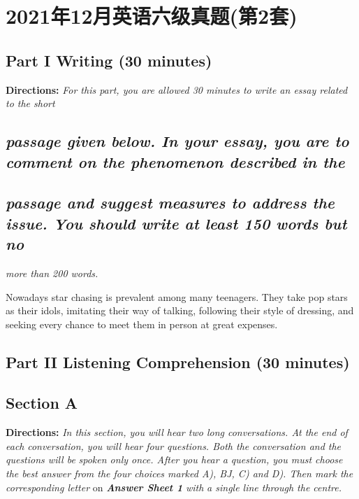 \documentclass[UTF8,11pt]{ctexart}
\begin{document}
\section*{2021年12月英语六级真题(第2套)}
\subsection*{\textbf{Part I} \textbf{Writing} \textbf{(30 minutes)}}


\textbf{Directions: }\textit{For this part, you are allowed 30 minutes to write an essay related to the short}


\subsection*{\textit{passage given below. In your essay, you are to comment on the phenomenon described in the}}


\subsection*{\textit{passage and suggest measures to address the issue. You should write at least 150 words but no}}


\textit{more than 200 words.}


Nowadays star chasing is prevalent among many teenagers. They take pop stars as their idols, imitating their way of talking, following their style of dressing, and seeking every chance to meet them in person at great expenses.


\subsection*{\textbf{Part II} \textbf{Listening Comprehension} \textbf{(30 minutes)}}


\subsection*{\textbf{Section A}}


\textbf{Directions: }\textit{In this section, you will hear two long conversations. At the end of each} \textit{conversation, you will hear four questions. Both the conversation and the questions will be} \textit{spoken only once. After you hear a question, you must choose the best answer from the four} \textit{choices marked A), BJ, C) and D). Then mark the corresponding letter }on \textbf{\textit{Answer Sheet 1 }}\textit{with} \textit{a single line through the centre.}
\end{document}
